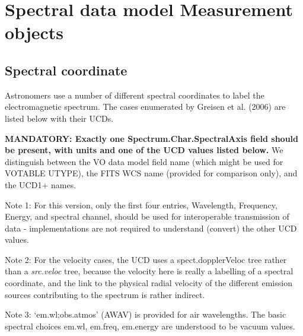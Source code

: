 \documentclass[11pt]{article}
\newcommand{\htwidth}[1]{}
\begin{document}
\htwidth{0}

\section{Spectral data model Measurement objects}

\subsection{Spectral coordinate}

Astronomers use a number of different spectral coordinates
to label the electromagnetic spectrum. The cases enumerated
by Greisen et al. (2006) are listed below with their UCDs.

{\bf MANDATORY: Exactly one Spectrum.Char.SpectralAxis field should be present,
with units and one of the UCD values listed below.}
We distinguish between the VO data model field name (which might
be used for VOTABLE UTYPE),
the FITS WCS name (provided for comparison only), and the UCD1+ names.

Note 1: For this version, only the first four entries, Wavelength,
Frequency, Energy, and spectral channel, should be used for
interoperable transmission of data - implementations are not required to
understand (convert) the other UCD values. 

Note 2: For the velocity cases, the UCD uses a spect.dopplerVeloc tree
rather than a {\it src.veloc } tree, because the velocity here
is really a labelling of a spectral coordinate, and the link to
the physical radial velocity of the different emission sources contributing
to the spectrum is rather indirect.

Note 3: `em.wl;obs.atmos' (AWAV) is provided for air wavelengths. The basic spectral
choices em.wl, em.freq, em.energy are understood to be vacuum values.
\end{document}
